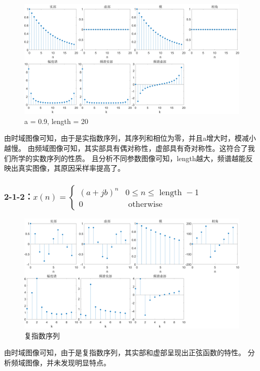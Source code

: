 \documentclass{../source/Experiment}
\begin{document}
\begin{figure}[H]
    \centering
    \includegraphics[width = \textwidth]{src/2_1_1c}
    \caption{a = 0.9, length = 20}
\end{figure}

由时域图像可知，由于是实指数序列，其序列和相位为零，并且a增大时，模减小越慢。
由频域图像可知，其实部具有偶对称性，虚部具有奇对称性。这符合了我们所学的实数序列的性质。
且分析不同参数图像可知，length越大，频谱越能反映出真实图像，其原因采样率提高了。

\subsubsection{2-1-2：$x(n)=\left\{\begin{array}{cl}(a+j b)^{n} & 0 \leq n \leq \text { length }-1 \\ 0 & \text { otherwise }\end{array}\right.$}

\begin{figure}[H]
    \centering
    \includegraphics[width = \textwidth]{src/2_1_2}
    \caption{复指数序列}
\end{figure}

由时域图像可知，由于是复指数序列，其实部和虚部呈现出正弦函数的特性。
分析频域图像，并未发现明显特点。
\end{document}

